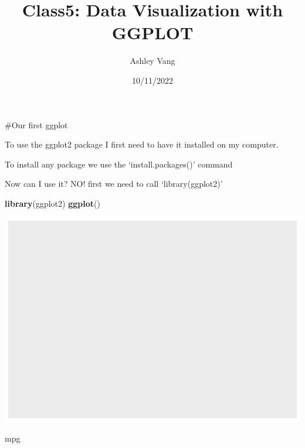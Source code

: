 \documentclass[
]{article}
\title{Class5: Data Visualization with GGPLOT}
\author{Ashley Vang}
\date{10/11/2022}
\newenvironment{Shaded}{\begin{snugshade}}{\end{snugshade}}
\newcommand{\KeywordTok}[1]{\textcolor[rgb]{0.13,0.29,0.53}{\textbf{#1}}}
\newcommand{\NormalTok}[1]{#1}
\begin{document}
\maketitle

\#Our first ggplot

To use the ggplot2 package I first need to have it installed on my
computer.

To install any package we use the `install.packages()' command

Now can I use it? NO! first we need to call `library(ggplot2)'

\begin{Shaded}
\begin{Highlighting}[]
\KeywordTok{library}\NormalTok{(ggplot2)}
\KeywordTok{ggplot}\NormalTok{()}
\end{Highlighting}
\end{Shaded}

\includegraphics{class05_files/figure-latex/unnamed-chunk-1-1.pdf}

\begin{Shaded}
\begin{Highlighting}[]
\NormalTok{mpg}
\end{Highlighting}
\end{Shaded}
\end{document}
